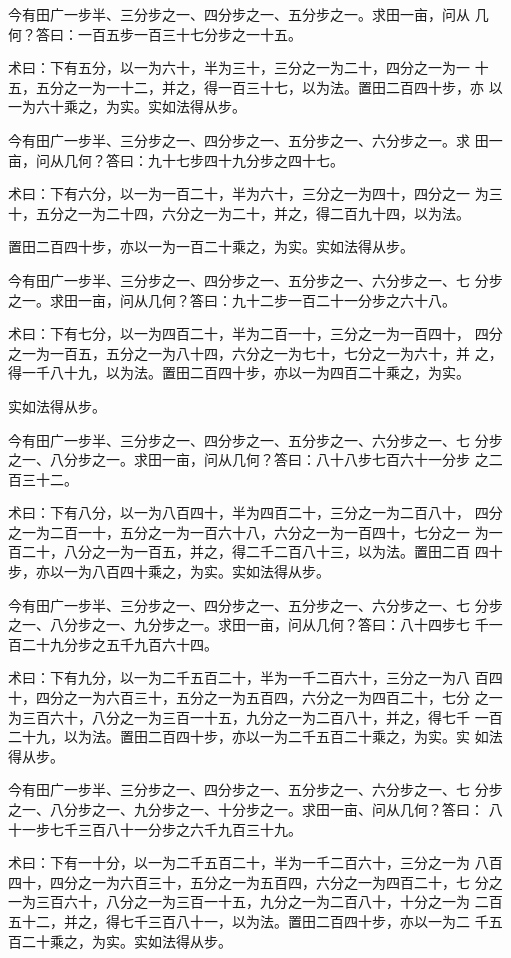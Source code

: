 \documentclass[a4paper,12pt,UTF8,twoside]{ctexbook}
\begin{document}
今有田广一步半、三分步之一、四分步之一、五分步之一。求田一亩，问从 几何？答曰：一百五步一百三十七分步之一十五。

术曰：下有五分，以一为六十，半为三十，三分之一为二十，四分之一为一 十五，五分之一为一十二，并之，得一百三十七，以为法。置田二百四十步，亦 以一为六十乘之，为实。实如法得从步。

今有田广一步半、三分步之一、四分步之一、五分步之一、六分步之一。求 田一亩，问从几何？答曰：九十七步四十九分步之四十七。

术曰：下有六分，以一为一百二十，半为六十，三分之一为四十，四分之一 为三十，五分之一为二十四，六分之一为二十，并之，得二百九十四，以为法。

置田二百四十步，亦以一为一百二十乘之，为实。实如法得从步。

今有田广一步半、三分步之一、四分步之一、五分步之一、六分步之一、七 分步之一。求田一亩，问从几何？答曰：九十二步一百二十一分步之六十八。

术曰：下有七分，以一为四百二十，半为二百一十，三分之一为一百四十， 四分之一为一百五，五分之一为八十四，六分之一为七十，七分之一为六十，并 之，得一千八十九，以为法。置田二百四十步，亦以一为四百二十乘之，为实。

实如法得从步。

今有田广一步半、三分步之一、四分步之一、五分步之一、六分步之一、七 分步之一、八分步之一。求田一亩，问从几何？答曰：八十八步七百六十一分步 之二百三十二。

术曰：下有八分，以一为八百四十，半为四百二十，三分之一为二百八十， 四分之一为二百一十，五分之一为一百六十八，六分之一为一百四十，七分之一 为一百二十，八分之一为一百五，并之，得二千二百八十三，以为法。置田二百 四十步，亦以一为八百四十乘之，为实。实如法得从步。

今有田广一步半、三分步之一、四分步之一、五分步之一、六分步之一、七 分步之一、八分步之一、九分步之一。求田一亩，问从几何？答曰：八十四步七 千一百二十九分步之五千九百六十四。

术曰：下有九分，以一为二千五百二十，半为一千二百六十，三分之一为八 百四十，四分之一为六百三十，五分之一为五百四，六分之一为四百二十，七分 之一为三百六十，八分之一为三百一十五，九分之一为二百八十，并之，得七千 一百二十九，以为法。置田二百四十步，亦以一为二千五百二十乘之，为实。实 如法得从步。

今有田广一步半、三分步之一、四分步之一、五分步之一、六分步之一、七 分步之一、八分步之一、九分步之一、十分步之一。求田一亩、问从几何？答曰： 八十一步七千三百八十一分步之六千九百三十九。

术曰：下有一十分，以一为二千五百二十，半为一千二百六十，三分之一为 八百四十，四分之一为六百三十，五分之一为五百四，六分之一为四百二十，七 分之一为三百六十，八分之一为三百一十五，九分之一为二百八十，十分之一为 二百五十二，并之，得七千三百八十一，以为法。置田二百四十步，亦以一为二 千五百二十乘之，为实。实如法得从步。
\end{document}
